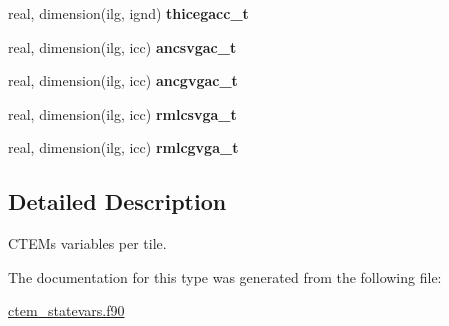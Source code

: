 \begin{DoxyCompactItemize}
\item 
\hypertarget{structctem__statevars_1_1ctem__tile__level_ae18e613f6319acdaa739d669c553dcb5}{}real, dimension(ilg, ignd) {\bfseries thicegacc\+\_\+t}\label{structctem__statevars_1_1ctem__tile__level_ae18e613f6319acdaa739d669c553dcb5}

\item 
\hypertarget{structctem__statevars_1_1ctem__tile__level_ac13e8be66b89cb28bad06cf9e060ba18}{}real, dimension(ilg, icc) {\bfseries ancsvgac\+\_\+t}\label{structctem__statevars_1_1ctem__tile__level_ac13e8be66b89cb28bad06cf9e060ba18}

\item 
\hypertarget{structctem__statevars_1_1ctem__tile__level_a08f95976b8e4799e422027e8b73bf34b}{}real, dimension(ilg, icc) {\bfseries ancgvgac\+\_\+t}\label{structctem__statevars_1_1ctem__tile__level_a08f95976b8e4799e422027e8b73bf34b}

\item 
\hypertarget{structctem__statevars_1_1ctem__tile__level_a5ffc637f55e57a3b600df1bd21794ad1}{}real, dimension(ilg, icc) {\bfseries rmlcsvga\+\_\+t}\label{structctem__statevars_1_1ctem__tile__level_a5ffc637f55e57a3b600df1bd21794ad1}

\item 
\hypertarget{structctem__statevars_1_1ctem__tile__level_ad71adfbf5bb76a25209cfe256ca52a79}{}real, dimension(ilg, icc) {\bfseries rmlcgvga\+\_\+t}\label{structctem__statevars_1_1ctem__tile__level_ad71adfbf5bb76a25209cfe256ca52a79}

\end{DoxyCompactItemize}


\subsection{Detailed Description}
C\+T\+E\+M\textquotesingle{}s variables per tile. 

The documentation for this type was generated from the following file\+:\begin{DoxyCompactItemize}
\item 
\hyperlink{ctem__statevars_8f90}{ctem\+\_\+statevars.\+f90}\end{DoxyCompactItemize}
